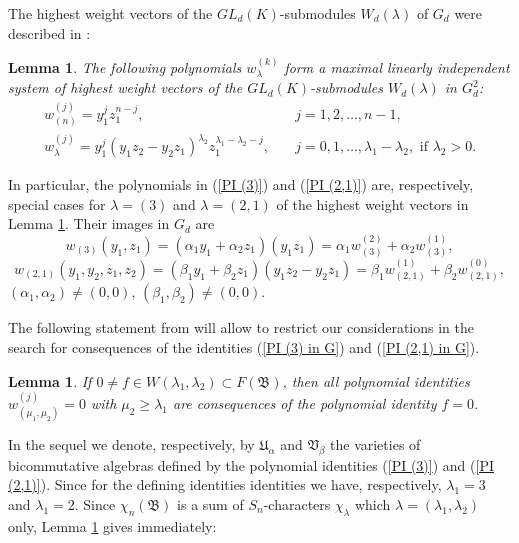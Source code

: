 \documentclass{amsart}
\newtheorem{lemma}[theorem]{Lemma}
\theoremstyle{definition}
\begin{document}
The highest weight vectors of the $GL_d(K)$-submodules $W_d(\lambda)$ of $G_d$ were described in \cite[Lemma 3.3]{Dr3}:

\begin{lemma}\label{hwv of G}
The following polynomials $w_{\lambda}^{(k)}$ form a maximal linearly independent system of highest weight vectors of the $GL_d(K)$-submodules $W_d(\lambda)$ in $G_d^2$:
\begin{equation}\label{hwv of W(lambda)}
\begin{split}
w_{(n)}^{(j)}=y_1^jz_1^{n-j},&\quad j=1,2,\ldots,n-1,\\
w_{\lambda}^{(j)}=y_1^j(y_1z_2-y_2z_1)^{\lambda_2}z_1^{\lambda_1-\lambda_2-j}, &\quad j=0,1,\ldots,\lambda_1-\lambda_2,\text{ if }\lambda_2>0.
\end{split}
\end{equation}
\end{lemma}

In particular, the polynomials in (\ref{PI (3)}) and (\ref{PI (2,1)}) are, respectively,
special cases for $\lambda=(3)$ and $\lambda=(2,1)$ of the highest weight vectors in Lemma \ref{hwv of G}.
Their images in $G_d$ are
\begin{equation}\label{PI (3) in G}
w_{(3)}(y_1,z_1)=(\alpha_1y_1+\alpha_2z_1)(y_1z_1)=\alpha_1w_{(3)}^{(2)}+\alpha_2w_{(3)}^{(1)},
\end{equation}
\begin{equation}\label{PI (2,1) in G}
w_{(2,1)}(y_1,y_2,z_1,z_2)=(\beta_1y_1+\beta_2z_1)(y_1z_2-y_2z_1)=\beta_1w_{(2,1)}^{(1)}+\beta_2w_{(2,1)}^{(0)},
\end{equation}
$(\alpha_1,\alpha_2)\not=(0,0)$, $(\beta_1,\beta_2)\not=(0,0)$.

The following statement from \cite[Lemma 4.2]{Dr3} will allow to restrict our considerations
in the search for consequences of the identities (\ref{PI (3) in G}) and (\ref{PI (2,1) in G}).

\begin{lemma}\label{consequences of w(lambda)}
If $0\not=f\in W(\lambda_1,\lambda_2)\subset F({\mathfrak B})$, then all polynomial identities $w_{(\mu_1,\mu_2)}^{(j)}=0$ with $\mu_2\geq \lambda_1$
are consequences of the polynomial identity $f=0$.
\end{lemma}

In the sequel we denote, respectively, by ${\mathfrak U}_{\alpha}$ and ${\mathfrak V}_{\beta}$ the varieties of bicommutative algebras
defined by the polynomial identities (\ref{PI (3)}) and (\ref{PI (2,1)}).
Since for the defining identities identities we have, respectively, $\lambda_1=3$ and $\lambda_1=2$.
Since $\chi_n({\mathfrak B})$ is a sum of $S_n$-characters $\chi_{\lambda}$ which $\lambda=(\lambda_1,\lambda_2)$ only,
Lemma \ref{consequences of w(lambda)} gives immediately:
\end{document}
